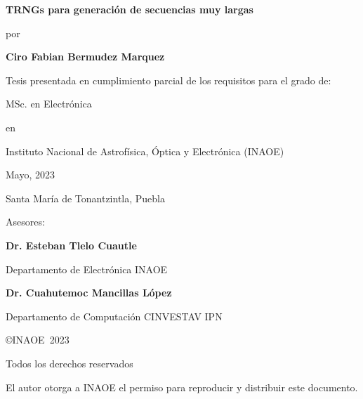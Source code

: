 \documentclass[12pt,a4paper]{report}
\newcommand{\Ptitle}{TRNGs para generación de secuencias muy largas}
\newcommand{\Pauthor}{Ciro Fabian Bermudez Marquez}
\newcommand{\Pdegree}{MSc. en Electrónica}
\newcommand{\Padvisor}{Dr. Esteban Tlelo Cuautle}
\newcommand{\Pcoadvisor}{Dr. Cuahutemoc Mancillas López}
\newcommand{\Pdepartmentadvisor}{Departamento de Electrónica INAOE}
\newcommand{\Pdepartmentcoadvisor}{Departamento de Computación CINVESTAV IPN}
\newcommand{\Pinstitution}{Instituto Nacional de Astrofísica, Óptica y Electrónica (INAOE)}
\newcommand{\Pmonth}{Mayo, }
\newcommand{\Pyear}{2023}
\newcommand{\Paddres}{Santa María de Tonantzintla, Puebla}
\newlength{\vertical}\setlength{\vertical}{0.8cm}
\begin{document}
\begin{titlepage}
    \begin{center}
        {\Large\bf\Ptitle\par}
        \vspace{\vertical}
        
        {por\par}
        \vspace{\vertical}
        
        {\bf\Pauthor\par}
        \vspace{\vertical}
        
        {Tesis presentada en cumplimiento parcial de los requisitos para el grado de:\par}
        \vspace{\vertical}
        
        {\Pdegree\par}
        \vspace{\vertical}
        
        {en\par}
        \vspace{\vertical}
        
        {\Pinstitution\par}
        \vspace{\vertical}
        
        {\Pmonth\Pyear\par}
        \vspace{\vertical}
    
        {\Paddres\par}        
        \vspace{\vertical}
        
        {Asesores:\par}
        \vspace{\vertical}
        
        {\bf\Padvisor\par}
        {\Pdepartmentadvisor\par}
        \vspace{\vertical}
        
        {\bf\Pcoadvisor\par}
        {\Pdepartmentcoadvisor\par}
        \vspace{\vertical}
        
        {\copyright INAOE~\Pyear\par}
        {Todos los derechos reservados\par}
        {El autor otorga a INAOE el permiso para reproducir y distribuir este documento.\par}
    \end{center}

\end{titlepage}

\end{document}
